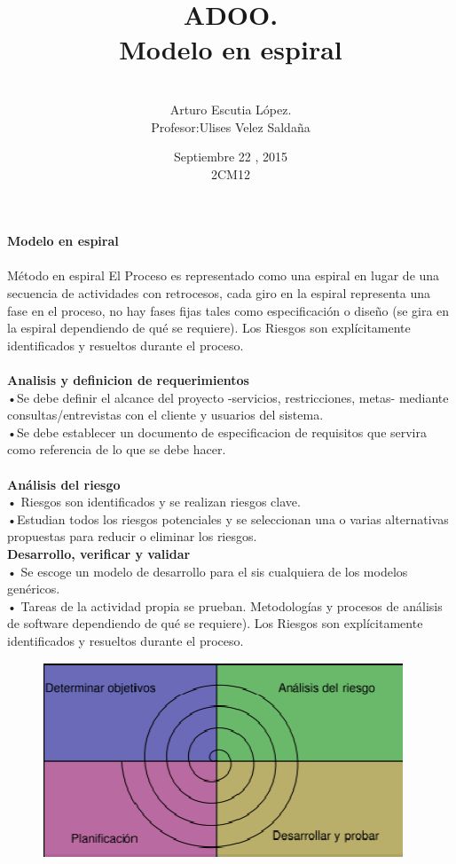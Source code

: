 \documentclass{article}
\title{\Huge ADOO.\vspace{1 cm}  \\ Modelo en espiral \vspace{1 cm} }
\author{\\ \Huge Arturo Escutia López.\vspace{2 cm}\\ \Huge Profesor:Ulises Velez Saldaña}
\date{\Huge\vspace{2 cm}Septiembre 22 , 2015 \Huge  \vspace{2 cm} \\2CM12 \vspace{4 cm}}
\begin{document}
 


\maketitle

 \LARGE  \textbf{Modelo en espiral }\\ \\
\large 
 Método en espiral
 El Proceso es representado como una espiral en lugar de una secuencia de
 actividades con retrocesos, cada giro en la espiral representa una fase en el
 proceso, no hay fases fijas tales como especificación o diseño (se gira en la espiral 
 dependiendo de qué se requiere). Los Riesgos son explícitamente identificados y
 resueltos durante el proceso.
\\ \\ \textbf{Analisis y definicion de requerimientos} 
\\•Se debe definir el alcance del proyecto -servicios, restricciones,
metas- mediante consultas/entrevistas con el cliente y usuarios
del sistema.
\\•Se debe establecer un documento de especificacion de requisitos que servira como referencia de lo que se debe hacer.\\ 
 \\ \textbf{Análisis del riesgo }
 \\• Riesgos son identificados y se realizan
 riesgos clave.
\\ •Estudian todos los riesgos potenciales y se seleccionan una o varias
 alternativas propuestas para reducir o eliminar los riesgos.
 \vspace{5 cm}
 \\ \textbf{ Desarrollo, verificar y validar }
\\ • Se escoge un modelo de desarrollo para el sis
 cualquiera de los modelos genéricos.
\\ • Tareas de la actividad propia se prueban.
 Metodologías y procesos de análisis de software
 dependiendo de qué se requiere). Los Riesgos son explícitamente identificados y
 resueltos durante el proceso.\\
 \begin{figure}
 	\centering
 	\includegraphics[width=1\linewidth]{1}
 	\caption{}
 	\label{fig:1}
 \end{figure}
\end{document}
